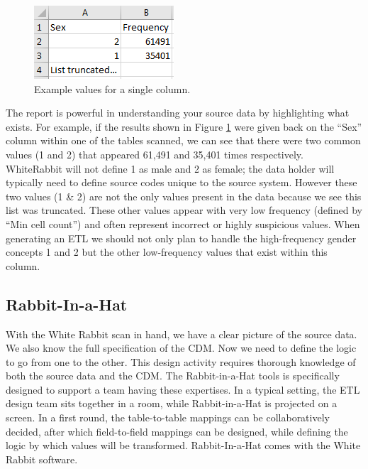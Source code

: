 \documentclass[11pt]{book}
\theoremstyle{definition}
\theoremstyle{definition}
\theoremstyle{definition}
\theoremstyle{remark}
\begin{document}
\begin{figure}
\includegraphics[width=0.3\linewidth]{images/ExtractTransformLoad/ScanSex} \caption{Example values for a single column.}\label{fig:scanSex}
\end{figure}

The report is powerful in understanding your source data by highlighting what exists. For example, if the results shown in Figure \ref{fig:scanSex} were given back on the ``Sex'' column within one of the tables scanned, we can see that there were two common values (1 and 2) that appeared 61,491 and 35,401 times respectively. WhiteRabbit will not define 1 as male and 2 as female; the data holder will typically need to define source codes unique to the source system. However these two values (1 \& 2) are not the only values present in the data because we see this list was truncated. These other values appear with very low frequency (defined by ``Min cell count'') and often represent incorrect or highly suspicious values. When generating an ETL we should not only plan to handle the high-frequency gender concepts 1 and 2 but the other low-frequency values that exist within this column.

\hypertarget{rabbit-in-a-hat}{%
\subsection{Rabbit-In-a-Hat}\label{rabbit-in-a-hat}}

With the White Rabbit scan in hand, we have a clear picture of the source data. We also know the full specification of the CDM. Now we need to define the logic to go from one to the other. This design activity requires thorough knowledge of both the source data and the CDM. The Rabbit-in-a-Hat tools is specifically designed to support a team having these expertises. In a typical setting, the ETL design team sits together in a room, while Rabbit-in-a-Hat is projected on a screen. In a first round, the table-to-table mappings can be collaboratively decided, after which field-to-field mappings can be designed, while defining the logic by which values will be transformed. Rabbit-In-a-Hat comes with the White Rabbit software.  
\end{document}
